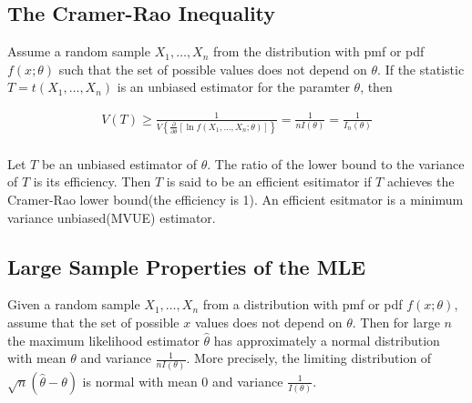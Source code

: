 \subsection{The Cramer-Rao Inequality}

\begin{theorem}
    Assume a random sample $X_1,\dots,X_n$ from the distribution with pmf or pdf $f(x;\theta)$ such that the set of possible values does not depend on $\theta$. If the statistic $T=t(X_1,\dots,X_n)$ is an unbiased estimator for the paramter $\theta$, then 

    \begin{align*}
        V(T) \geq \frac{1}{V\left\{\frac{\partial}{\partial\theta}[\ln f(X_1,\dots,X_n;\theta)]\right\}} = \frac{1}{nI(\theta)} = \frac{1}{I_n(\theta)} \\
    \end{align*}
\end{theorem}

\begin{definition}
    Let $T$ be an unbiased estimator of $\theta$. The ratio of the lower bound to the variance of $T$ is its efficiency. Then $T$ is said to be an efficient esitimator if $T$ achieves the Cramer-Rao lower bound(the efficiency is 1). An efficient esitmator is a minimum variance unbiased(MVUE) estimator.
\end{definition}

\subsection{Large Sample Properties of the MLE}

\begin{theorem}
    Given a random sample $X_1,\dots,X_n$ from a distribution with pmf or pdf $f(x;\theta)$, assume that the set of possible $x$ values does not depend on $\theta$. Then for large $n$ the maximum likelihood estimator $\hat{\theta}$ has approximately a normal distribution with mean $\theta$ and variance $\frac{1}{nI(\theta)}$. More precisely, the limiting distribution of $\sqrt{n}(\hat{\theta}-\theta)$ is normal with mean 0 and variance $\frac{1}{I(\theta)}$.
\end{theorem}
